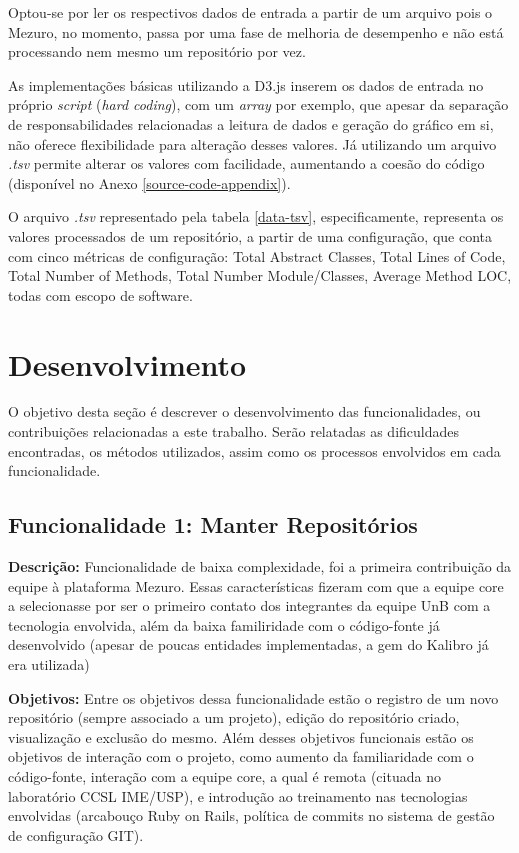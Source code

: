 Optou-se por ler os respectivos dados de entrada a partir de um arquivo pois o Mezuro, no momento, passa por uma fase de melhoria de desempenho e não está processando nem mesmo um repositório por vez.

As implementações básicas utilizando a D3.js inserem os dados de entrada no próprio \textit{script} (\textit{hard coding}), com um \textit{array} por exemplo, que apesar da separação de responsabilidades relacionadas a leitura de dados e geração do gráfico em si, não oferece flexibilidade para alteração desses valores. Já utilizando um arquivo \textit{.tsv} permite alterar os valores com facilidade, aumentando a coesão do código (disponível no Anexo \ref{source-code-appendix}). 

O arquivo \textit{.tsv} representado pela tabela \ref{data-tsv}, especificamente, representa os valores processados de um repositório, a partir de uma configuração, que conta com cinco métricas de configuração: Total Abstract Classes, Total Lines of Code, Total Number of Methods, Total Number Module/Classes, Average Method LOC, todas com escopo de software.

\section{Desenvolvimento}

O objetivo desta seção é descrever o desenvolvimento das funcionalidades, ou contribuições relacionadas a este trabalho. Serão relatadas as dificuldades encontradas, os métodos utilizados, assim como os processos envolvidos em cada funcionalidade.

\subsection{Funcionalidade 1: Manter Repositórios}
\label{functionality-1}

\textbf{Descrição:} Funcionalidade de baixa complexidade, foi a primeira contribuição da equipe à plataforma Mezuro. Essas características fizeram com que a equipe core a selecionasse por ser o primeiro contato dos integrantes da equipe UnB com a tecnologia envolvida, além da baixa familiridade com o código-fonte já desenvolvido (apesar de poucas entidades implementadas, a gem do Kalibro já era utilizada)

\textbf{Objetivos:} Entre os objetivos dessa funcionalidade estão o registro de um novo repositório (sempre associado a um projeto), edição do repositório criado, visualização e exclusão do mesmo. Além desses objetivos funcionais estão os objetivos de interação com o projeto, como aumento da familiaridade com o código-fonte, interação com a equipe core, a qual é remota (cituada no laboratório CCSL IME/USP), e introdução ao treinamento nas tecnologias envolvidas (arcabouço Ruby on Rails, política de commits no sistema de gestão de configuração GIT).

